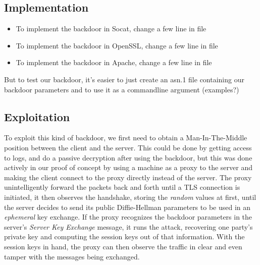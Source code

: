 \documentclass[a4paper,11pt,twocolumn]{article}
\begin{document}

\subsection{Implementation}

\begin{itemize}
    \item To implement the backdoor in Socat, change a few line in file
    \item To implement the backdoor in OpenSSL, change a few line in file
    \item To implement the backdoor in Apache, change a few line in file
\end{itemize}

But to test our backdoor, it's easier to just create an asn.1 file containing our backdoor parameters and to use it as a commandline argument (examples?)

\subsection{Exploitation}

To exploit this kind of backdoor, we first need to obtain a Man-In-The-Middle position between the client and the server. This could be done by getting access to logs, and do a passive decryption after using the backdoor, but this was done actively in our proof of concept by using a machine as a proxy to the server and making the client connect to the proxy directly instead of the server. The proxy unintelligently forward the packets back and forth until a TLS connection is initiated, it then observes the handshake, storing the \emph{random} values at first, until the server decides to send its public Diffie-Hellman parameters to be used in an \emph{ephemeral} key exchange. If the proxy recognizes the backdoor parameters in the server's \emph{Server Key Exchange} message, it runs the attack, recovering one party's private key and computing the session keys out of that information. With the session keys in hand, the proxy can then observe the traffic in clear and even tamper with the messages being exchanged.
\end{document}

